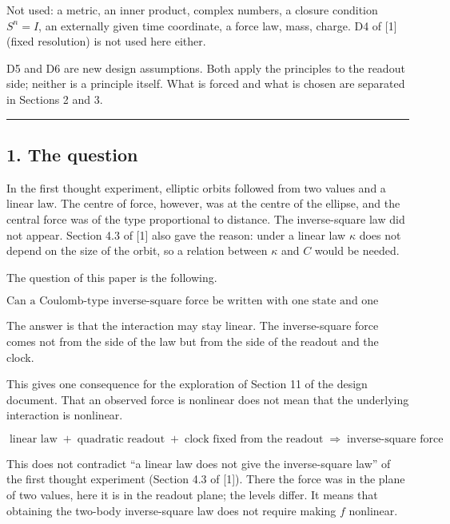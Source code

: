 \documentclass[
  a4paper,
]{article}
\begin{document}
Not used: a metric, an inner product, complex numbers, a closure
condition \(S^n=I\), an externally given time coordinate, a force law,
mass, charge. D4 of {[}1{]} (fixed resolution) is not used here either.

D5 and D6 are new design assumptions. Both apply the principles to the
readout side; neither is a principle itself. What is forced and what is
chosen are separated in Sections 2 and 3.

\begin{center}\rule{0.5\linewidth}{0.5pt}\end{center}

\subsection{1. The question}\label{the-question}

In the first thought experiment, elliptic orbits followed from two
values and a linear law. The centre of force, however, was at the centre
of the ellipse, and the central force was of the type proportional to
distance. The inverse-square law did not appear. Section 4.3 of {[}1{]}
also gave the reason: under a linear law \(\kappa\) does not depend on
the size of the orbit, so a relation between \(\kappa\) and \(C\) would
be needed.

The question of this paper is the following.

\[
\boxed{\text{Can a Coulomb-type inverse-square force be written with one state and one relation alone? May the interaction stay linear?}}
\]

The answer is that the interaction may stay linear. The inverse-square
force comes not from the side of the law but from the side of the
readout and the clock.

This gives one consequence for the exploration of Section 11 of the
design document. That an observed force is nonlinear does not mean that
the underlying interaction is nonlinear.

\[
\boxed{\;\text{linear law}\;+\;\text{quadratic readout}\;+\;\text{clock fixed from the readout}\;\Longrightarrow\;\text{inverse-square force}\;}
\]

This does not contradict ``a linear law does not give the inverse-square
law'' of the first thought experiment (Section 4.3 of {[}1{]}). There
the force was in the plane of two values, here it is in the readout
plane; the levels differ. It means that obtaining the two-body
inverse-square law does not require making \(f\) nonlinear.
\end{document}
